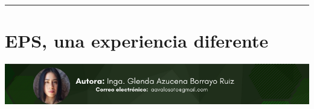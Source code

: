 \documentclass[12pt,spanish,Letterpaper,openany]{book}
\newcommand{\HRule}{\begin{center}\rule{0.5\linewidth}{0.2mm}\end{center}}
\begin{document}
\medskip

\HRule

\medskip

\hypertarget{article03}{%
\chapter{EPS, una experiencia diferente}\label{article03}}

\begin{center}\includegraphics[width=1\linewidth]{images/glenda} \end{center}
\end{document}
